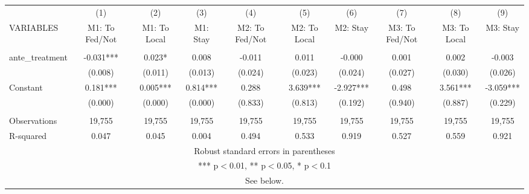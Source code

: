 \begin{tabular}{lccccccccc} \hline
 & (1) & (2) & (3) & (4) & (5) & (6) & (7) & (8) & (9) \\
VARIABLES & M1: To Fed/Not & M1: To Local & M1: Stay & M2: To Fed/Not & M2: To Local & M2: Stay & M3: To Fed/Not & M3: To Local & M3: Stay \\ \hline
 &  &  &  &  &  &  &  &  &  \\
ante\_treatment & -0.031*** & 0.023* & 0.008 & -0.011 & 0.011 & -0.000 & 0.001 & 0.002 & -0.003 \\
 & (0.008) & (0.011) & (0.013) & (0.024) & (0.023) & (0.024) & (0.027) & (0.030) & (0.026) \\
Constant & 0.181*** & 0.005*** & 0.814*** & 0.288 & 3.639*** & -2.927*** & 0.498 & 3.561*** & -3.059*** \\
 & (0.000) & (0.000) & (0.000) & (0.833) & (0.813) & (0.192) & (0.940) & (0.887) & (0.229) \\
 &  &  &  &  &  &  &  &  &  \\
Observations & 19,755 & 19,755 & 19,755 & 19,755 & 19,755 & 19,755 & 19,755 & 19,755 & 19,755 \\
 R-squared & 0.047 & 0.045 & 0.004 & 0.494 & 0.533 & 0.919 & 0.527 & 0.559 & 0.921 \\ \hline
\multicolumn{10}{c}{ Robust standard errors in parentheses} \\
\multicolumn{10}{c}{ *** p$<$0.01, ** p$<$0.05, * p$<$0.1} \\
\multicolumn{10}{c}{ See below.} \\
\end{tabular}
